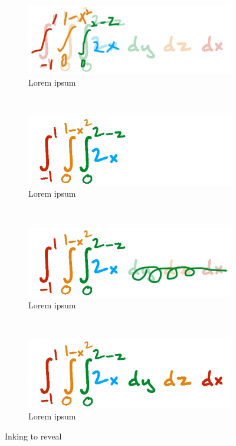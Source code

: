 \begin{figure}[t!]
    \centering
    \begin{subfigure}[t]{0.5\columnwidth}
        \centering
        \includegraphics[width=1\columnwidth]{figures/slowink_presenter}
        \caption{Lorem ipsum}
    \end{subfigure}%
    ~ 
    \begin{subfigure}[t]{0.5\columnwidth}
        \centering
        \includegraphics[width=1\columnwidth]{figures/slowink_audience}
        \caption{Lorem ipsum}
    \end{subfigure}
            ~
      \begin{subfigure}[t]{0.5\columnwidth}
        \centering
        \includegraphics[width=1\columnwidth]{figures/fastink_presenter}
        \caption{Lorem ipsum}
    \end{subfigure}%
    ~ 
    \begin{subfigure}[t]{0.5\columnwidth}
        \centering
        \includegraphics[width=1\columnwidth]{figures/fastink_audience}
        \caption{Lorem ipsum}
    \end{subfigure}
    \caption{Inking to reveal}
\end{figure}

